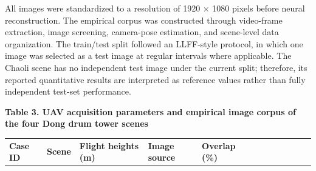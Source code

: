 All images were standardized to a resolution of 1920 × 1080 pixels
before neural reconstruction. The empirical corpus was constructed
through video-frame extraction, image screening, camera-pose estimation,
and scene-level data organization. The train/test split followed an
LLFF-style protocol, in which one image was selected as a test image at
regular intervals where applicable. The Chaoli scene has no independent
test image under the current split; therefore, its reported quantitative
results are interpreted as reference values rather than fully
independent test-set performance.

\textbf{Table 3. UAV acquisition parameters and empirical image corpus
of the four Dong drum tower scenes}

\begin{longtable}[]{@{}
  >{\centering\arraybackslash}p{}
  >{\centering\arraybackslash}p{}
  >{\centering\arraybackslash}p{}
  >{\centering\arraybackslash}p{}
  >{\raggedleft\arraybackslash}p{}
  >{\centering\arraybackslash}p{}
  >{\raggedleft\arraybackslash}p{}
  >{\raggedleft\arraybackslash}p{}
  >{\centering\arraybackslash}p{}
  >{\centering\arraybackslash}p{}
  >{\raggedleft\arraybackslash}p{}
  >{\raggedleft\arraybackslash}p{}@{}}
\toprule\noalign{}
\begin{minipage}[b]{\linewidth}\centering
\textbf{Case ID}
\end{minipage} & \begin{minipage}[b]{\linewidth}\centering
\textbf{Scene}
\end{minipage} & \begin{minipage}[b]{\linewidth}\centering
\textbf{Flight heights (m)}
\end{minipage} & \begin{minipage}[b]{\linewidth}\centering
\textbf{Image source}
\end{minipage} & \begin{minipage}[b]{\linewidth}\centering
\textbf{Overlap (\%)}
\end{minipage} & \begin{minipage}[b]{\linewidth}\centering

\end{minipage}
\end{longtable}
